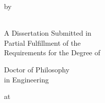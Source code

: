
\begin{center}
	\doublespacing
	\thispagestyle{empty}

	\textsc{\LARGE \ThesisTitle	}

 	\vspace{2cm}

	by \\
	\ThesisAuthor \\

 	\vfill

	A Dissertation Submitted in \\
	Partial Fulfillment of the \\
	Requirements for the Degree of \\
 
	\vspace{1cm}

	Doctor of Philosophy \\
	in Engineering
 
	\vspace{2cm}

	at \\
	\UniversityName \\
	\ThesisMonth\space\ThesisYear

	\vspace{2cm}

\end{center}

\clearpage

